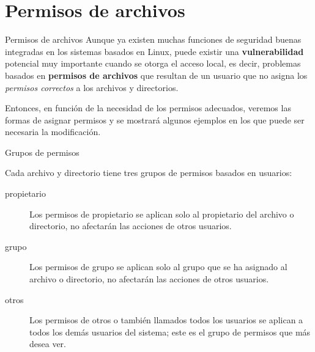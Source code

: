 
\section{Permisos de archivos}

\begin{frame}[c]{Permisos de archivos}
  Aunque ya existen muchas funciones de seguridad buenas integradas en los
  sistemas basados en Linux, puede existir una \textbf{vulnerabilidad}
  potencial muy importante cuando se otorga el acceso local, es decir,
  problemas basados en \textbf{permisos de archivos} que resultan de un
  usuario que no asigna los \emph{permisos correctos} a los archivos y
  directorios.

  \vspace{\baselineskip}
  Entonces, en función de la necesidad de los permisos adecuados,
  veremos las formas de asignar permisos y se mostrará algunos ejemplos en
  los que puede ser necesaria la modificación.
\end{frame}

\begin{frame}[c]{Grupos de permisos}

  Cada archivo y directorio tiene tres grupos de permisos basados en usuarios:

  \vspace{\baselineskip}
  \begin{description}
    \item [propietario] Los permisos de propietario se aplican solo al
      propietario del archivo o directorio, no afectarán las acciones de
      otros usuarios.
    \pausa
    \item [grupo] Los permisos de grupo se aplican solo al grupo que se ha
      asignado al archivo o directorio, no afectarán las acciones de
      otros usuarios.
    \pausa
    \item [otros] Los permisos de otros o también llamados todos los usuarios
      se aplican a todos los demás usuarios del sistema; este es el grupo de
      permisos que más desea ver.
  \end{description}
\end{frame}

